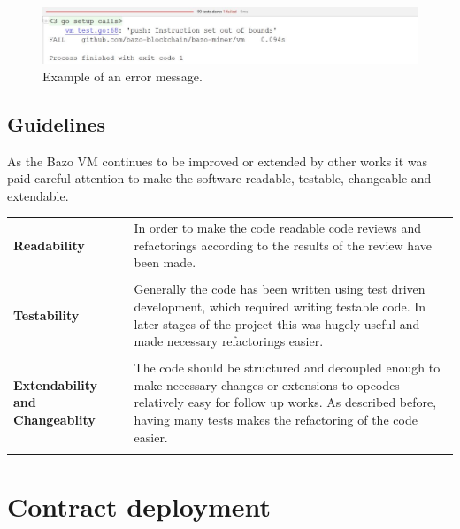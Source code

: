 \begin{figure}[H]
	\begin{center}
	\includegraphics[width=\textwidth]{./images/push-test-failure}
	\caption{Example of an error message.}
	\label{pushtestfailure}
	\end{center}
\end{figure}

\subsection{Guidelines}
As the Bazo VM continues to be improved or extended by other works it was paid careful attention to make the software readable, testable, changeable and extendable. 

\begin{tabular}[t]{ p{3cm} p{12.5cm}}
\raggedright
\textbf{Readability} &
In order to make the code readable code reviews and refactorings according to the results of the review have been made. \\ \\

\raggedright
\textbf{Testability} &
Generally the code has been written using test driven development, which required writing testable code. In later stages of the project this was hugely useful and made necessary refactorings easier. \\ \\
 
\raggedright
\textbf{Extendability and Changeablity} &
The code should be structured and decoupled enough to make necessary changes or extensions to opcodes relatively easy for follow up works. As described before, having many tests makes the refactoring of the code easier. \\ \\ 

\end{tabular}

\section{Contract deployment}

